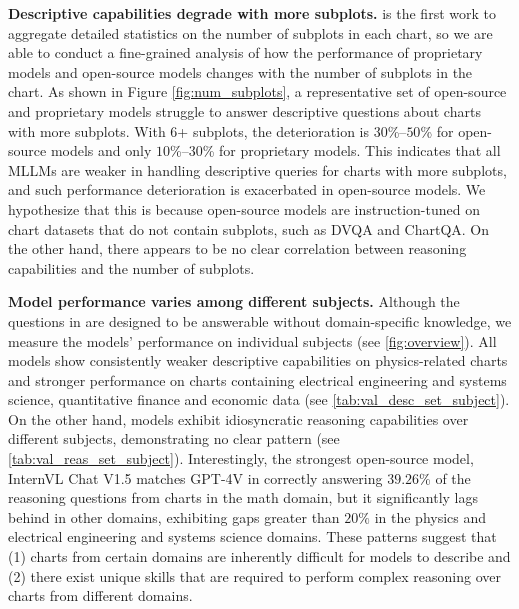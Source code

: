 \textbf{Descriptive capabilities degrade with more subplots.  }
\ours{} is the first work to aggregate detailed statistics on the number of subplots in each chart, so we are able to conduct a fine-grained analysis of how the performance of proprietary models and open-source models changes with the number of subplots in the chart. 
As shown in Figure \ref{fig:num_subplots}, a representative set of open-source and proprietary models struggle to answer descriptive questions about charts with more subplots. 
With 6+ subplots, the deterioration is $30$\%--$50$\% for open-source models and only $10$\%--$30$\% for proprietary models.
This indicates that all MLLMs are weaker in handling descriptive queries for charts with more subplots, and such performance deterioration is exacerbated in open-source models.
We hypothesize that this is because open-source models are instruction-tuned on chart datasets that do not contain subplots, such as DVQA and ChartQA.
On the other hand, there appears to be no clear correlation between reasoning capabilities and the number of subplots.

\textbf{Model performance varies among different subjects.  }
Although the questions in \ours{} are designed to be answerable without domain-specific knowledge, we measure the models' performance on individual subjects (see \cref{fig:overview}). 
All models show consistently weaker descriptive capabilities on physics-related charts and stronger performance on charts containing electrical engineering and systems science, quantitative finance and economic data (see \cref{tab:val_desc_set_subject}).
On the other hand, models exhibit idiosyncratic reasoning capabilities over different subjects, demonstrating no clear pattern (see \cref{tab:val_reas_set_subject}).
Interestingly, the strongest open-source model, InternVL Chat V1.5 matches GPT-4V in correctly answering $39.26$\% of the reasoning questions from charts in the math domain, but it significantly lags behind in other domains, exhibiting gaps greater than $20\%$ in the physics and electrical engineering and systems science domains.
These patterns suggest that (1) charts from certain domains are inherently difficult for models to describe and (2) there exist unique skills that are required to perform complex reasoning over charts from different domains.
